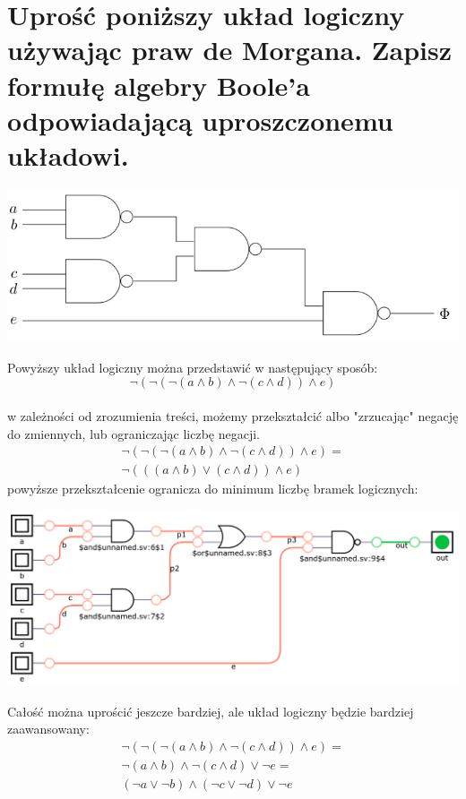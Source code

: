 \documentclass{article}
\begin{document}
\section{Uprość poniższy układ logiczny używając praw de Morgana. Zapisz formułę algebry Boole’a odpowiadającą
uproszczonemu układowi.}
\begin{center}
	\includegraphics[scale=0.4]{./L01Z08.png}
\end{center}
Powyższy układ logiczny można przedstawić w następujący sposób:
$$\neg(\neg(\neg(a \wedge b) \wedge \neg(c \wedge d))\wedge e)$$\\
w zależności od zrozumienia treści, możemy przekształcić albo "zrzucając" negację do zmiennych, lub  ograniczając liczbę negacji. 
\begin{gather*}
\neg(\neg(\neg(a \wedge b) \wedge \neg(c \wedge d))\wedge e) = \\ \neg(((a \wedge b) \vee (c \wedge d))\wedge e)
\end{gather*}
powyższe przekształcenie ogranicza do minimum liczbę bramek logicznych:
\begin{center}
	\includegraphics[scale=0.2]{./L01Z08LC.png}
\end{center}
Całość można uprościć jeszcze bardziej, ale układ logiczny będzie bardziej zaawansowany:
\begin{gather*}
\neg(\neg(\neg(a \wedge b) \wedge \neg(c \wedge d))\wedge e) = \\ \neg(a \wedge b) \wedge \neg(c \wedge d)\vee \neg e = \\ (\neg a \vee \neg b) \wedge (\neg c \vee \neg d)\vee \neg e
\end{gather*}
\end{document}
